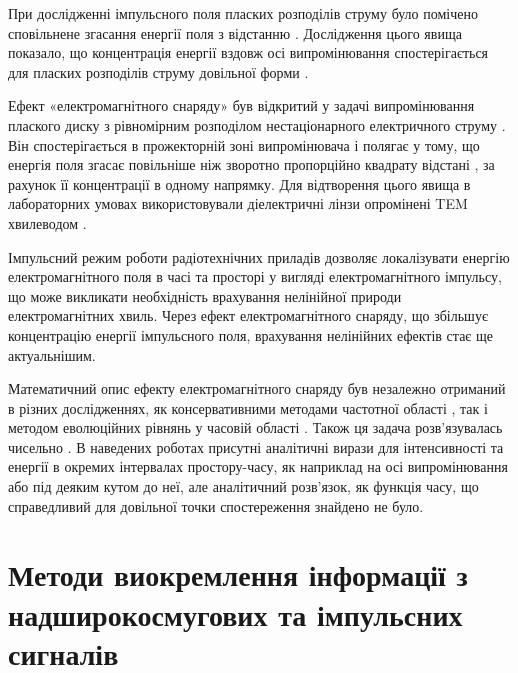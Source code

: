 При дослідженні імпульсного поля пласких розподілів струму було 
помічено сповільнене згасання енергії поля з відстанню \cite{imp:Wu1989}. 
Дослідження цього явища показало, що концентрація енергії вздовж осі 
випромінювання спостерігається для пласких розподілів струму довільної форми 
\cite{imp:Wu1985}.

Ефект «електромагнітного снаряду» був відкритий у задачі випромінювання 
плаского диску з рівномірним розподілом нестаціонарного електричного струму 
\cite{imp:Wu1985}. Він спостерігається в прожекторній зоні випромінювача і 
полягає у тому, що енергія поля згасає повільніше ніж зворотно пропорційно 
квадрату відстані \cite{imp:Sodin1992-10}, за рахунок її концентрації в 
одному напрямку. Для відтворення цього явища в лабораторних умовах 
використовували діелектричні лінзи опромінені TEM хвилеводом \cite{imp:Wu1991}.

Імпульсний режим роботи радіотехнічних приладів дозволяє локалізувати енергію 
електромагнітного поля в часі та просторі у вигляді електромагнітного 
імпульсу, що може викликати необхідність врахування нелінійної природи 
електромагнітних хвиль. Через ефект електромагнітного снаряду, що збільшує 
концентрацію енергії імпульсного поля, врахування нелінійних ефектів стає 
ще актуальнішим.

Математичний опис ефекту електромагнітного снаряду був незалежно отриманий 
в різних дослідженнях, як консервативними методами частотної області
\cite{imp:Wu1987, imp:Samsonov1986}, так і методом еволюційних рівнянь у 
часовій області \cite{imp:Dumin1996}. Також ця задача розв'язувалась 
чисельно \cite{imp:Butrim2004}. В наведених роботах присутні
аналітичні вирази для інтенсивності та енергії в окремих інтервалах 
простору-часу, як наприклад на осі випромінювання або під деяким кутом до 
неї, але аналітичний розв'язок, як функція часу, що справедливий для 
довільної точки спостереження знайдено не було.

\section{Методи виокремлення інформації з надширокосмугових та імпульсних сигналів}

